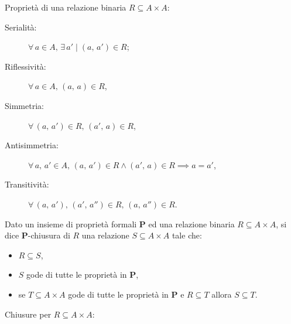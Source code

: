 \documentclass[10pt]{article}
\begin{document}
        Proprietà di una relazione binaria \(R \subseteq A \times A\):

        \medskip

        \begin{minipage}[h]{.4\textwidth}
            \begin{description}
                \item[Serialità:] \(\forall \, a \in A, \, \exists \, a' \; | \; (a, \, a') \in R\);
                \item[Riflessività:] \(\forall \, a \in A, \, (a, \, a) \in R\),
                \item[Simmetria:] \(\forall \, (a, \, a') \in R, \, (a', \, a) \in R\),
            \end{description}
        \end{minipage}
        \begin{minipage}[h]{.6\textwidth}
            \begin{description}
                \item[Antisimmetria:] \(\forall \, a, \, a' \in A, \, (a, \, a') \in R \land (a', \, a) \in R \implies a = a'\),
                \item[Transitività:] \(\forall \, (a, \, a'), \, (a', \, a'') \in R, \, (a, \, a'') \in R\).
            \end{description}
        \end{minipage}

        \medskip

        Dato un insieme di proprietà formali \textbf{P} ed una relazione binaria \(R \subseteq A \times A\), si dice \textbf{P}-chiusura
        di \(R\) una relazione \(S \subseteq A \times A\) tale che:
        \begin{itemize}
            \item \(R \subseteq S\),
            \item \(S\) gode di tutte le proprietà in \textbf{P},
            \item se \(T \subseteq A \times A\) gode di tutte le proprietà in \textbf{P} e \(R \subseteq T\) allora \(S \subseteq T\).
        \end{itemize}
        
        Chiusure per \(R \subseteq A \times A\):

        \medskip
\end{document}

